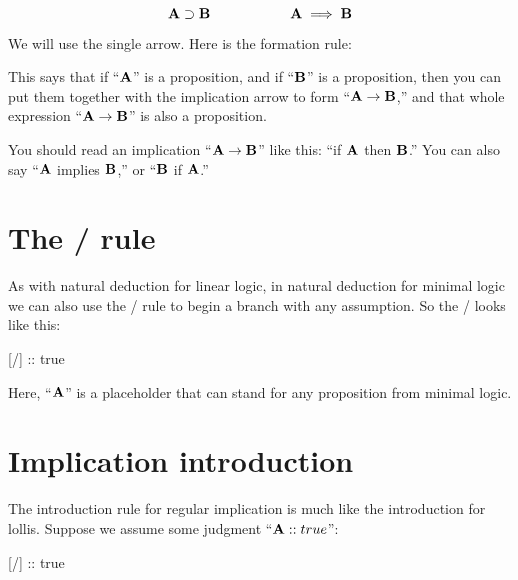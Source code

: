 \documentclass[../../../main.tex]{subfiles}
\begin{document}
\begin{equation*}
  \mathbf{A \supset B} \hskip 2cm \mathbf{A \implies B}
\end{equation*}

\noindent
We will use the single arrow. Here is the formation rule:

\begin{prooftree*}
\end{prooftree*}

\noindent
This says that if ``$\mathbf{A}$'' is a proposition, and if ``$\mathbf{B}$'' is a proposition, then you can put them together with the implication arrow to form ``$\nd{A \impl/ B}$,'' and that whole expression ``$\nd{A \impl/ B}$'' is also a proposition.

You should read an implication ``$\nd{A \impl/ B}$'' like this: ``if $\mathbf{A}$ then $\mathbf{B}$.'' You can also say ``$\mathbf{A}$ implies $\mathbf{B}$,'' or ``$\mathbf{B}$ if $\mathbf{A}$.''


\section{The \startrule/ rule}

As with natural deduction for linear logic, in natural deduction for minimal logic we can also use the \startrule/ rule to begin a branch with any assumption. So the \startrule/ looks like this:

\begin{prooftree*}
  \hypo{}
  [\startrule/]{ :: true}
\end{prooftree*} 

\noindent
Here, ``$\mathbf{A}$'' is a placeholder that can stand for any proposition from minimal logic. 


\section{Implication introduction}

The introduction rule for regular implication is much like the introduction for lollis. Suppose we assume some judgment ``$\mathbf{A} :: true$'':

\begin{prooftree*}
  \hypo{}
  [\startrule/]{ :: true}
\end{prooftree*}
\end{document}
